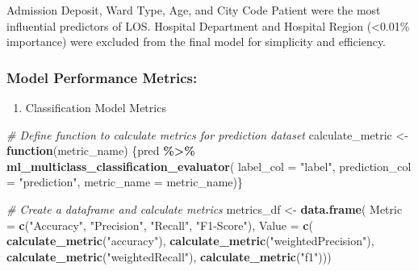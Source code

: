 \documentclass[
]{article}
\newenvironment{Shaded}{\begin{snugshade}}{\end{snugshade}}
\newcommand{\AttributeTok}[1]{\textcolor[rgb]{0.13,0.29,0.53}{#1}}
\newcommand{\CommentTok}[1]{\textcolor[rgb]{0.56,0.35,0.01}{\textit{#1}}}
\newcommand{\ControlFlowTok}[1]{\textcolor[rgb]{0.13,0.29,0.53}{\textbf{#1}}}
\newcommand{\FunctionTok}[1]{\textcolor[rgb]{0.13,0.29,0.53}{\textbf{#1}}}
\newcommand{\NormalTok}[1]{#1}
\newcommand{\OtherTok}[1]{\textcolor[rgb]{0.56,0.35,0.01}{#1}}
\newcommand{\SpecialCharTok}[1]{\textcolor[rgb]{0.81,0.36,0.00}{\textbf{#1}}}
\newcommand{\StringTok}[1]{\textcolor[rgb]{0.31,0.60,0.02}{#1}}
\providecommand{\tightlist}{%
  \setlength{\itemsep}{0pt}\setlength{\parskip}{0pt}}
\begin{document}
Admission Deposit, Ward Type, Age, and City Code Patient were the most
influential predictors of LOS. Hospital Department and Hospital Region
(\textless0.01\% importance) were excluded from the final model for
simplicity and efficiency.

\subsubsection{Model Performance
Metrics:}\label{model-performance-metrics}

\begin{enumerate}
\def\labelenumi{\arabic{enumi}.}
\tightlist
\item
  Classification Model Metrics
\end{enumerate}

\begin{Shaded}
\begin{Highlighting}[]
\CommentTok{\# Define function to calculate metrics for prediction dataset }
\NormalTok{calculate\_metric }\OtherTok{\textless{}{-}} \ControlFlowTok{function}\NormalTok{(metric\_name) }
\NormalTok{  \{pred }\SpecialCharTok{\%\textgreater{}\%}
    \FunctionTok{ml\_multiclass\_classification\_evaluator}\NormalTok{(}
      \AttributeTok{label\_col =} \StringTok{"label"}\NormalTok{,}
      \AttributeTok{prediction\_col =} \StringTok{"prediction"}\NormalTok{,}
      \AttributeTok{metric\_name =}\NormalTok{ metric\_name)\}}

\CommentTok{\# Create a dataframe and calculate metrics}
\NormalTok{metrics\_df }\OtherTok{\textless{}{-}} \FunctionTok{data.frame}\NormalTok{(}
  \AttributeTok{Metric =} \FunctionTok{c}\NormalTok{(}\StringTok{"Accuracy"}\NormalTok{, }\StringTok{"Precision"}\NormalTok{, }\StringTok{"Recall"}\NormalTok{, }\StringTok{"F1{-}Score"}\NormalTok{),}
  \AttributeTok{Value =} \FunctionTok{c}\NormalTok{(}
    \FunctionTok{calculate\_metric}\NormalTok{(}\StringTok{"accuracy"}\NormalTok{),}
    \FunctionTok{calculate\_metric}\NormalTok{(}\StringTok{"weightedPrecision"}\NormalTok{),}
    \FunctionTok{calculate\_metric}\NormalTok{(}\StringTok{"weightedRecall"}\NormalTok{),}
    \FunctionTok{calculate\_metric}\NormalTok{(}\StringTok{"f1"}\NormalTok{)))}


\end{Highlighting}
\end{Shaded}
\end{document}
